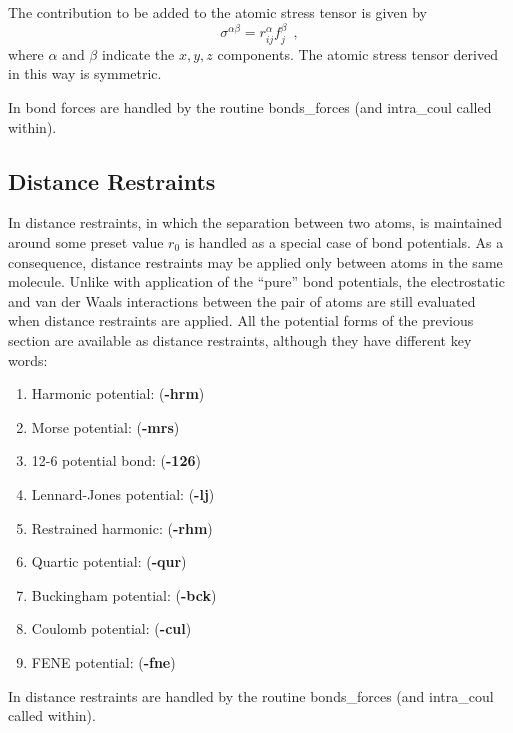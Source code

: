 The contribution to be added to the atomic stress
tensor is given by
\begin{equation}
\sigma^{\alpha \beta} = r_{ij}^{\alpha} f_{j}^{\beta}~~, \label{bonds}
\end{equation}
where $\alpha$ and $\beta$ indicate the $x,y,z$ components.  The
atomic stress tensor derived in this way is
symmetric.

In \D bond forces are handled by the routine {\sc bonds\_forces}
(and {\sc intra\_coul} called within).

\subsection{Distance Restraints}

In \D distance restraints, in which the separation between two
atoms, is maintained around some preset value $r_0$ is handled as
a special case of bond potentials.  As a consequence, distance
restraints may be applied only between atoms in the same molecule.
Unlike with application of the ``pure'' bond
potentials, the
electrostatic and van der
Waals interactions between the pair
of atoms are still evaluated when distance restraints are applied.
All the potential forms of the previous section are available as
distance restraints, although they have
different key words:

\begin{enumerate}
\item Harmonic potential:  ({\bf -hrm})
\item Morse potential:  ({\bf -mrs})
\item 12-6 potential bond:  ({\bf -126})
\item Lennard-Jones potential:  ({\bf -lj})
\item Restrained harmonic:  ({\bf -rhm})
\item Quartic potential:  ({\bf -qur})
\item Buckingham potential:  ({\bf -bck})
\item Coulomb potential:  ({\bf -cul})
\item FENE potential:  ({\bf -fne})
\end{enumerate}

In \D distance restraints are handled
by the routine {\sc bonds\_forces} (and {\sc intra\_coul} called within).

